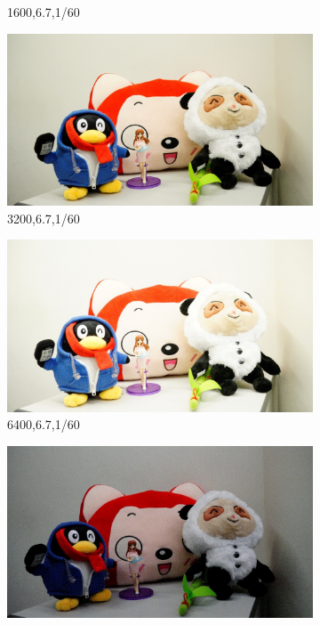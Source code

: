 \begin{figure}
\begin{subfigure}[t]{0.32\textwidth}
		\caption{1600,6.7,1/60}
    \end{subfigure}
    \hfill
    \begin{subfigure}[t]{0.32\textwidth}
        \centering
        \includegraphics[width=1\textwidth]{images/dataset/3200_6-7_1-60.jpg}
		\caption{3200,6.7,1/60}
    \end{subfigure}
    \hfill
    \begin{subfigure}[t]{0.32\textwidth}
        \centering
        \includegraphics[width=1\textwidth]{images/dataset/6400_6-7_1-60.jpg}
		\caption{6400,6.7,1/60}
    \end{subfigure}
    \hfill
    \begin{subfigure}[t]{0.32\textwidth}
        \centering
        \includegraphics[width=1\textwidth]{images/dataset/6400_6-7_1-350.jpg}

\end{subfigure}
\end{figure}
